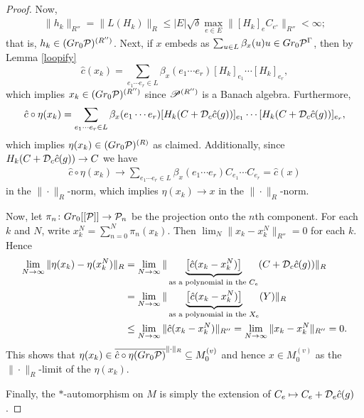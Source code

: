 \begin{proof}
Now,
\begin{align*}
\|h_k\|_{R''} = \|L(H_k)\|_R \leq |E|\sqrt{\delta}\max_{e\in E} \|[H_k]_eC_{e^\circ}\|_{R''} <\infty;
\end{align*}
that is, $h_k\in (Gr_0\mc{P})^{(R'')}$. Next, if $x$ embeds as $\sum_{u\in L} \beta_x(u) u\in Gr_0\mc{P}^\Gamma$, then by Lemma \ref{loopify}
\[
\hat{c}(x_k)=\sum_{e_1\cdots e_r\in L}\beta_x(e_1\cdots e_r)[H_k]_{e_1}\cdots [H_k]_{e_r},
\]
which implies $x_k\in (Gr_0\mc{P})^{(R'')}$ since $\P^{(R'')}$ is a Banach algebra. Furthermore,
\begin{equation}
\hat{c}\circ \eta(x_k)=\sum_{e_1\cdots e_r\in L}\beta_x(e_1\cdots e_r)[H_k(C+\D_c\hat{c}(g))]_{e_1}\cdots [H_k(C+\D_c\hat{c}(g))]_{e_r},
\end{equation}
which implies $\eta(x_k)\in (Gr_0\mc{P})^{(R)}$ as claimed. Additionally, since $H_k(C+\D_c\hat{c}(g))\to C$ we have
\begin{align*}
\hat{c}\circ \eta(x_k)\to \sum_{e_1\cdots e_r\in L}\beta_x(e_1\cdots e_r)C_{e_1}\cdots C_{e_r} =\hat{c}(x)
\end{align*}
in the $\|\cdot\|_R$-norm, which implies $\eta(x_k)\to x$ in the $\|\cdot\|_R$-norm.

Now, let $\pi_n\colon Gr_0[[\mc{P}]]\to \mc{P}_n$ be the projection onto the $n$th component. For each $k$ and $N$, write $x_k^N=\sum_{n=0}^N \pi_n(x_k)$. Then $\lim_N \|x_k - x_k^N\|_{R''}=0$ for each $k$. Hence
	\begin{align*}
		\lim_{N\to\infty}\| \eta(x_k) - \eta(x_k^N) \|_R &= \lim_{N\to\infty}\| \underbrace{\left[\hat{c}(x_k - x_k^N)\right]}_{\text{as a polynomial in the $C_e$}}(C+\D_c\hat{c}(g))\|_R \\
			&= \lim_{N\to\infty}\| \underbrace{\left[\hat{c}(x_k - x_k^N)\right]}_{\text{as a polynomial in the $X_e$}}(Y)\|_R\\
			&\leq \lim_{N\to\infty}\| \hat{c}(x_k - x_k^N)\|_{R''} = \lim_{N\to\infty}\| x_k - x_k^N \|_{R''}= 0.
	\end{align*}
This shows that $\eta(x_k) \in \overline{\hat{c}\circ\eta( Gr_0\mc{P})}^{\|\cdot\|_{R}}\subset  M_0^{(v)}$ and hence $x\in M_0^{(v)}$ as the $\|\cdot\|_{R}$-limit of the $\eta(x_k)$.

Finally, the $*$-automorphism on $M$ is simply the extension of $C_e\mapsto C_e+\D_e\hat{c}(g)$.
\end{proof}



